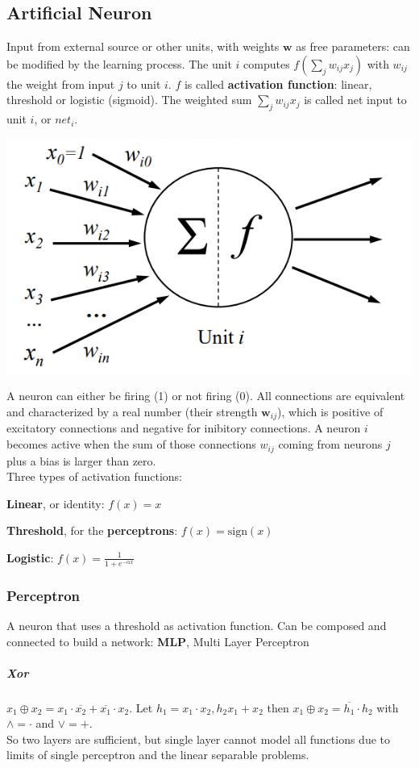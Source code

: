 \documentclass[10pt]{report}
\begin{document}
\subsection{Artificial Neuron} Input from external source or other units, with weights $\mathbf{w}$ as free parameters: can be modified by the learning process. The unit $i$ computes $f(\sum_j w_{ij}x_j)$ with $w_{ij}$ the weight from input $j$ to unit $i$. $f$ is called \textbf{activation function}: linear, threshold or logistic (sigmoid). The weighted sum $\sum_j w_{ij}x_j$ is called net input to unit $i$, or $net_i$.
\begin{center}
	\includegraphics[scale=0.75]{6.png}
\end{center}
A neuron can either be firing (1) or not firing (0). All connections are equivalent and characterized by a real number (their strength $\mathbf{w}_{ij}$), which is positive of excitatory connections and negative for inibitory connections. A neuron $i$ becomes active when the sum of those connections $w_{ij}$ coming from neurons $j$ plus a bias is larger than zero.\\
Three types of activation functions:
\begin{list}{}{}
	\item \textbf{Linear}, or identity: $f(x) = x$
	\item \textbf{Threshold}, for the \textbf{perceptrons}: $f(x) = \text{sign}(x)$
	\item \textbf{Logistic}: $f(x) = \frac{1}{1 + e^{-\alpha x}}$
\end{list}
\subsubsection{Perceptron} A neuron that uses a threshold as activation function. Can be composed and connected to build a network: \textbf{MLP}, Multi Layer Perceptron 
\subparagraph{Xor} $x_1 \oplus x_2 = x_1\cdot \overline{x_2} + \overline{x_1}\cdot x_2$. Let $h_1 = x_1\cdot x_2, h_2 x_1 + x_2$ then $x_1 \oplus x_2 = \overline{h_1} \cdot h_2$ with $\wedge = \cdot$ and $\vee = +$.\\
So two layers are sufficient, but single layer cannot model all functions due to limits of single perceptron and the linear separable problems.
\end{document}
